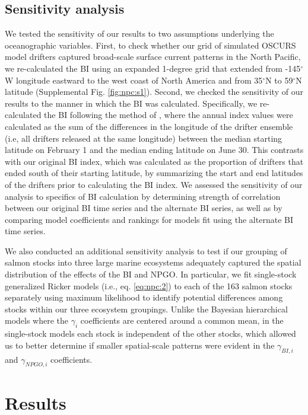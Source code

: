 \subsection{Sensitivity analysis}

We tested the sensitivity of our results to two assumptions underlying the
oceanographic variables. First, to check whether our grid of simulated OSCURS
model drifters captured broad-scale surface current patterns in the North
Pacific, we re-calculated the BI using an expanded 1-degree grid that extended
from -145$^{\circ}$W longitude eastward to the west coast of North America and
from 35$^{\circ}$N to 59$^{\circ}$N latitude (Supplemental Fig.
\ref{fig:npc:s1}). Second, we checked the sensitivity of our results to the
manner in which the BI was calculated. Specifically, we re-calculated the BI
following the method of \citet{Watters2008a}, where the annual index values were
calculated as the sum of the differences in the longitude of the drifter
ensemble (i.e, all drifters released at the same longitude) between the median
starting latitude on February 1 and the median ending latitude on June 30. This
contrasts with our original BI index, which was calculated as the proportion of
drifters that ended south of their starting latitude, by summarizing the start
and end latitudes of the drifters prior to calculating the BI index. We assessed
the sensitivity of our analysis to specifics of BI calculation by determining
strength of correlation between our original BI time series and the alternate BI
series, as well as by comparing model coefficients and rankings for models fit
using the alternate BI time series.

We also conducted an additional sensitivity analysis to test if our grouping of
salmon stocks into three large marine ecosystems adequately captured the spatial
distribution of the effects of the BI and NPGO. In particular, we fit
single-stock generalized Ricker models (i.e., eq. \ref{eq:npc:2}) to each of the
163 salmon stocks separately using maximum likelihood to identify potential
differences among stocks within our three ecosystem groupings. Unlike the
Bayesian hierarchical models where the \(\gamma_i\) coefficients are centered
around a common mean, in the single-stock models each stock is independent of
the other stocks, which allowed us to better determine if smaller spatial-scale
patterns were evident in the \(\gamma_{BI,i}\) and \(\gamma_{NPGO,i}\)
coefficients.


\section{Results}

